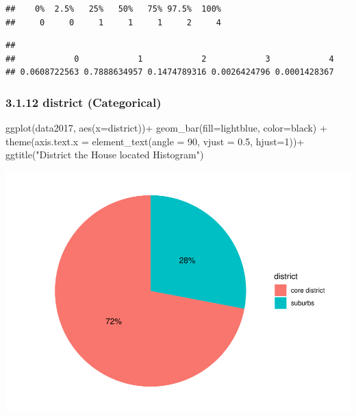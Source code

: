 \documentclass[
]{article}
\newenvironment{Shaded}{\begin{snugshade}}{\end{snugshade}}
\newcommand{\AttributeTok}[1]{\textcolor[rgb]{0.77,0.63,0.00}{#1}}
\newcommand{\DecValTok}[1]{\textcolor[rgb]{0.00,0.00,0.81}{#1}}
\newcommand{\FloatTok}[1]{\textcolor[rgb]{0.00,0.00,0.81}{#1}}
\newcommand{\FunctionTok}[1]{\textcolor[rgb]{0.00,0.00,0.00}{#1}}
\newcommand{\NormalTok}[1]{#1}
\newcommand{\SpecialCharTok}[1]{\textcolor[rgb]{0.00,0.00,0.00}{#1}}
\newcommand{\StringTok}[1]{\textcolor[rgb]{0.31,0.60,0.02}{#1}}
\begin{document}
\begin{verbatim}
##    0%  2.5%   25%   50%   75% 97.5%  100% 
##     0     0     1     1     1     2     4
\end{verbatim}

\begin{Shaded}
\end{Shaded}

\begin{verbatim}
## 
##            0            1            2            3            4 
## 0.0608722563 0.7888634957 0.1474789316 0.0026424796 0.0001428367
\end{verbatim}

\hypertarget{district-categorical}{%
\subsubsection{3.1.12 district
(Categorical)}\label{district-categorical}}

\begin{Shaded}
\begin{Highlighting}[]
\FunctionTok{ggplot}\NormalTok{(data2017, }\FunctionTok{aes}\NormalTok{(}\AttributeTok{x=}\NormalTok{district))}\SpecialCharTok{+}
  \FunctionTok{geom\_bar}\NormalTok{(}\AttributeTok{fill=}\StringTok{\textquotesingle{}lightblue\textquotesingle{}}\NormalTok{, }\AttributeTok{color=}\StringTok{\textquotesingle{}black\textquotesingle{}}\NormalTok{) }\SpecialCharTok{+}
  \FunctionTok{theme}\NormalTok{(}\AttributeTok{axis.text.x =} \FunctionTok{element\_text}\NormalTok{(}\AttributeTok{angle =} \DecValTok{90}\NormalTok{, }\AttributeTok{vjust =} \FloatTok{0.5}\NormalTok{, }\AttributeTok{hjust=}\DecValTok{1}\NormalTok{))}\SpecialCharTok{+}
  \FunctionTok{ggtitle}\NormalTok{(}\StringTok{"District the House located Histogram"}\NormalTok{) }
\end{Highlighting}
\end{Shaded}

\includegraphics{Project_files/figure-latex/unnamed-chunk-22-1.pdf}
\end{document}
